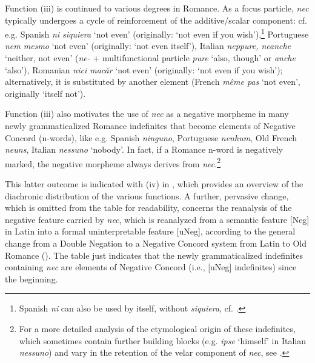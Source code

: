 \documentclass[output=paper]{langsci/langscibook}
\begin{document}
Function (iii) is continued to various degrees in Romance. As a focus particle, {\emph{nec}} typically undergoes a cycle of reinforcement of the additive\slash scalar component: cf. e.g. Spanish {\emph{ni siquiera}} `not even' (originally: `not even if you wish'),{\footnote{Spanish {\emph{ni}} can also be used by itself, without {\emph{siquiera}}, cf. \citet[]{Aranovich06}.}} Portuguese {\emph{nem mesmo}} `not even' (originally: `not even itself'), Italian {\emph{neppure, neanche}} `neither, not even' ({\emph{ne-}} + multifunctional particle {\emph{pure}} `also, though' or {\emph{anche}} `also'), Romanian {\emph{nici mac\u{a}r}} `not even' (originally: `not even if you wish'); alternatively, it is substituted by another element (French {\emph{m\^eme pas}} `not even', originally `itself not').

Function (iii) also motivates the use of {\emph{nec}} as a negative morpheme in many newly grammaticalized Romance indefinites that become elements of Negative Concord (n-words), like e.g. Spanish {\emph{ninguno}}, Portuguese {\emph{nenhum}}, Old French {\emph{neuns}}, Italian {\emph{nessuno}} `nobody'. In fact, if a Romance n-word is negatively marked, the negative morpheme always derives from {\emph{nec}}.{\footnote{For a more detailed analysis of the etymological origin of these indefinites, which sometimes contain further building blocks (e.g. {\emph{ipse}} `himself' in Italian {\emph{nessuno}}) and vary in the retention of the velar component of {\emph{nec}}, see \citet[225--228]{Gianollo18}.}}

This latter outcome is indicated with (iv) in , which provides an over\-view of the diachronic distribution of the various functions. A further, pervasive change, which is omitted from the table for readability, concerns the reanalysis of the negative feature carried by {\emph{nec}}, which is reanalyzed from a semantic feature [Neg] in Latin into a formal uninterpretable feature [uNeg], according to the general change from a Double Negation to a Negative Concord system from Latin to Old Romance (\citealt[chapters 4--5]{Gianollo18}). The table just indicates that the newly grammaticalized indefinites containing {\emph{nec}} are elements of Negative Concord (i.e., [uNeg] indefinites) since the beginning.
\end{document}
